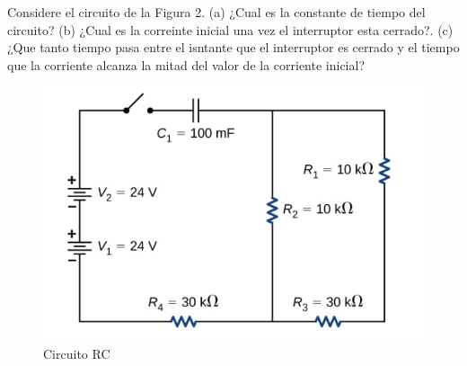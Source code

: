 \documentclass[10pt, legalpaper]{exam}
\begin{document}
\begin{questions}
\addpoints
\question[5] Considere el circuito de la Figura 2. (a) ¿Cual es la constante de tiempo del circuito? (b) ¿Cual es la correinte inicial una vez el interruptor esta cerrado?. (c) ¿Que tanto tiempo pasa entre el isntante que el interruptor es cerrado y el tiempo que la corriente alcanza la mitad del valor de la corriente inicial?
	\begin{figure}[h]
	    \centering
	    \includegraphics[width=0.8\linewidth]{Screenshot 2024-07-26 231805.png}
	    \caption{Circuito RC}
	    \label{fig:enter-label}
	\end{figure}


\end{questions}
\end{document}
